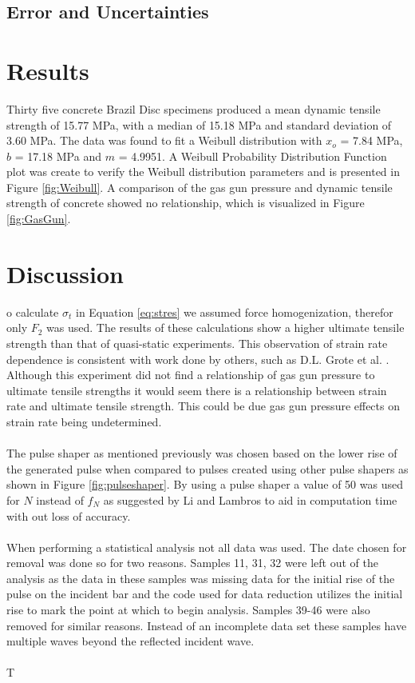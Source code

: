 \documentclass[12pt]{article}
\begin{document}
\subsection{Error and Uncertainties} %

\section{Results} %

Thirty five concrete Brazil Disc specimens produced a mean dynamic tensile strength of 15.77 MPa, with a median of 15.18 MPa and standard deviation of 3.60 MPa. The data was found to fit a Weibull distribution with $x_{o}$ = 7.84 MPa, $b$ = 17.18 MPa and $m$ = 4.9951. A Weibull Probability Distribution Function plot was create to verify the Weibull distribution parameters and is presented in Figure \ref{fig:Weibull}. A comparison of the gas gun pressure and dynamic tensile strength of concrete showed no relationship, which is visualized in Figure \ref{fig:GasGun}.

\section{Discussion} %
o calculate $\sigma_t$ in Equation \ref{eq:stres} we assumed force homogenization, therefor only $F_2$ was used. The results of these calculations show a higher ultimate tensile strength than that of quasi-static experiments. This observation of strain rate dependence is consistent with work done by others, such as D.L. Grote et al. \cite{Grote}. Although this experiment did not find a relationship of gas gun pressure to ultimate tensile strengths it would seem there is a relationship  between strain rate and ultimate tensile strength. This could be due gas gun pressure effects on strain rate being undetermined. 
\\
\\
The pulse shaper as mentioned previously was chosen based on the lower rise of the generated pulse when compared to pulses created using other pulse shapers as shown in Figure \ref{fig:pulseshaper}. By using a pulse shaper a value of 50 was used for $N$ instead of $f_N$ as suggested by Li and Lambros \cite{Li} to aid in computation time with out loss of accuracy.
\\
\\
When performing a statistical analysis not all data was used.  The date chosen for removal was done so for two reasons.  Samples 11, 31, 32 were left out of the analysis as the data in these samples was missing data for the initial rise of the pulse on the incident bar and the code used for data reduction utilizes the initial rise to mark the point at which to begin analysis.  Samples 39-46 were also removed for similar reasons.  Instead of an incomplete data set these samples have multiple waves beyond the  reflected incident wave.
\\
\\
T
\end{document}
